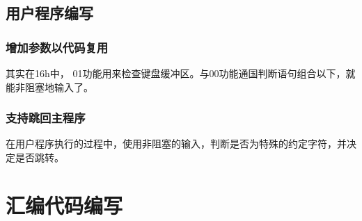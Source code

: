 \documentclass[a4paper,11pt,UTF8]{ctexart}
\begin{document}
	\subsection{用户程序编写}
		\subsubsection{增加参数以代码复用}
		其实在16h中，	01功能用来检查键盘缓冲区。与00功能通国判断语句组合以下，就能非阻塞地输入了。
		\subsubsection{支持跳回主程序}
		在用户程序执行的过程中，使用非阻塞的输入，判断是否为特殊的约定字符，并决定是否跳转。


\section{汇编代码编写}
\end{document}
